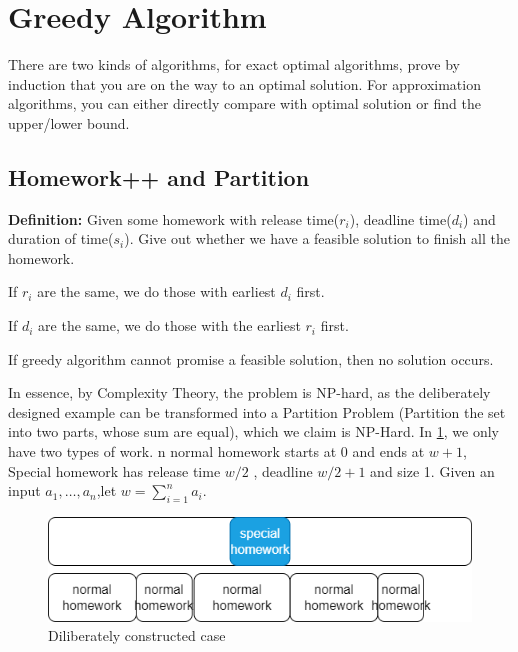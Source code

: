 \section{Greedy Algorithm}
There are two kinds of algorithms, for exact optimal algorithms, prove by induction that you are on the way to an optimal solution. For approximation algorithms, you can either directly compare with optimal solution or find the upper/lower bound.
\subsection*{Homework++ and Partition}
\textbf{Definition:}
Given some homework with release time($r_i$), deadline time($d_i$) and duration of time($s_i$). Give out whether we have a feasible solution to finish all the homework.

If $r_i$ are the same, we do those with earliest $d_i$ first.

If $d_i$ are the same, we do those with the earliest $r_i$ first.

If greedy algorithm cannot promise a feasible solution, then no solution occurs.

In essence, by Complexity Theory, the problem is NP-hard, as the deliberately designed example can be transformed into a Partition Problem (Partition the set into two parts, whose sum are equal), which we claim is NP-Hard. 
In \ref{fig:case_a}, we only have two types of work. n normal homework starts at 0 and ends at $w+1$, 
Special homework has release time $w/2$ , deadline $w/2+1$ and size 1. Given an input $a_1,\ldots,a_n$,let $w=\sum_{i=1}^n a_i$.

\begin{figure}
    \centering
    \includegraphics[width=0.6\linewidth]{Notes/fig/case_a.png}
    \caption{Diliberately constructed case}
    \label{fig:case_a}
\end{figure}

